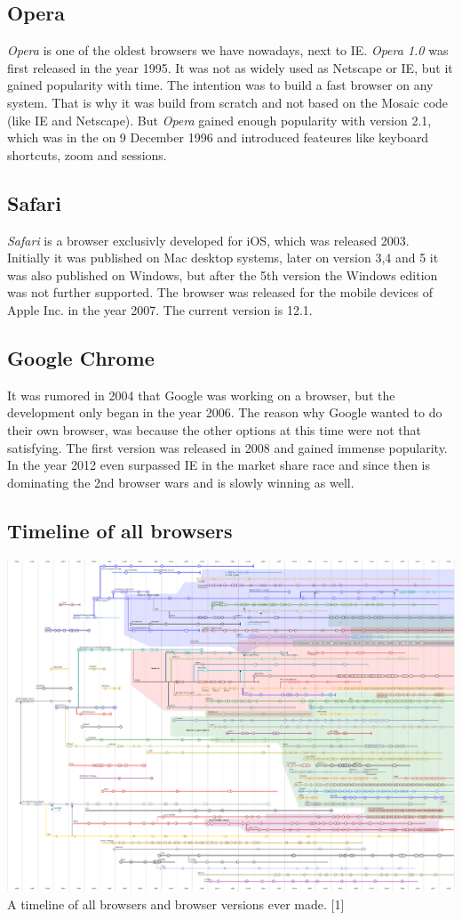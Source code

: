 \documentclass[runningheads]{llncs}
\begin{document}
		\subsection{Opera}
		\textit{Opera} is one of the oldest browsers we have nowadays, next to IE. \textit{Opera 1.0} was first released in the year 1995. It was not as widely used as Netscape or IE, but it gained popularity with time. The intention was to build a fast browser on any system. That is why it was build from scratch and not based on the Mosaic code (like IE and Netscape). But \textit{Opera} gained enough popularity with version 2.1, which was in the on 9 December 1996 and introduced feateures like keyboard shortcuts, zoom and sessions.
		\subsection{Safari}
		\textit{Safari} is a browser exclusivly developed for iOS, which was released 2003. Initially it was published on Mac desktop systems, later on version 3,4 and 5 it was also published on Windows, but after the 5th version the Windows edition was not further supported. The browser was released for the mobile devices of Apple Inc. in the year 2007. The current version is 12.1.
		\subsection{Google Chrome}
		It was rumored in 2004 that Google was working on a browser, but the development only began in the year 2006. The reason why Google wanted to do their own browser, was because the other options at this time were not that satisfying. The first version was released in 2008 and gained immense popularity. In the year 2012 even surpassed IE in the market share race and since then is dominating the 2nd browser wars and is slowly winning as well.
		\subsection{Timeline of all browsers}		\includegraphics{TimelineOfWebBrowsers.png} 
		A timeline of all browsers and browser versions ever made. [1]
		
\end{document}
